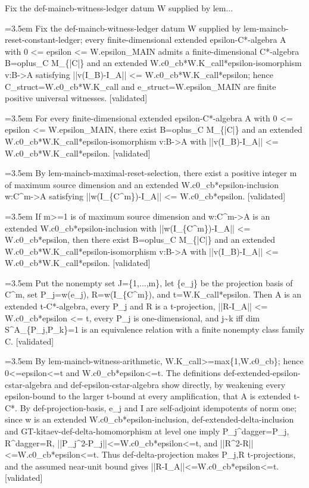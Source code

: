 \documentclass{article}
\newcommand{\step}[1]{\par\noindent\hangindent=3.5em\hangafter=1%
  \makebox[3.5em][l]{\textbf{#1.}}}
\newcommand{\steptag}[1]{\hfill{\small\textsf{[#1]}}}
\begin{document}
\begin{proofbox}{Fix the def-maincb-witness-ledger datum W supplied by lem...}
\step{1} Fix the def-maincb-witness-ledger datum W supplied by lem-maincb-reset-constant-ledger; every finite-dimensional extended epsilon-C*-algebra A with 0 <= epsilon <= W.epsilon\_MAIN admits a finite-dimensional C*-algebra B=oplus\_C M\_\{|C|\} and an extended W.c0\_cb*W.K\_call*epsilon-isomorphism v:B->A satisfying ||v(I\_B)-I\_A|| <= W.c0\_cb*W.K\_call*epsilon; hence C\_struct=W.c0\_cb*W.K\_call and e\_struct=W.epsilon\_MAIN are finite positive universal witnesses. \steptag{validated} \\[6pt]
\step{1.1} For every finite-dimensional extended epsilon-C*-algebra A with 0 <= epsilon <= W.epsilon\_MAIN, there exist B=oplus\_C M\_\{|C|\} and an extended W.c0\_cb*W.K\_call*epsilon-isomorphism v:B->A with ||v(I\_B)-I\_A|| <= W.c0\_cb*W.K\_call*epsilon. \steptag{validated} \\[6pt]
\step{1.1.1} By lem-maincb-maximal-reset-selection, there exist a positive integer m of maximum source dimension and an extended W.c0\_cb*epsilon-inclusion w:C\textasciicircum{}m->A satisfying ||w(I\_\{C\textasciicircum{}m\})-I\_A|| <= W.c0\_cb*epsilon. \steptag{validated} \\[4pt]
\step{1.1.2} If m>=1 is of maximum source dimension and w:C\textasciicircum{}m->A is an extended W.c0\_cb*epsilon-inclusion with ||w(I\_\{C\textasciicircum{}m\})-I\_A|| <= W.c0\_cb*epsilon, then there exist B=oplus\_C M\_\{|C|\} and an extended W.c0\_cb*W.K\_call*epsilon-isomorphism v:B->A with ||v(I\_B)-I\_A|| <= W.c0\_cb*W.K\_call*epsilon. \steptag{validated} \\[6pt]
\step{1.1.2.1} Put the nonempty set J=\{1,...,m\}, let \{e\_j\} be the projection basis of C\textasciicircum{}m, set P\_j=w(e\_j), R=w(I\_\{C\textasciicircum{}m\}), and t=W.K\_call*epsilon. Then A is an extended t-C*-algebra, every P\_j and R is a t-projection, ||R-I\_A|| <= W.c0\_cb*epsilon <= t, every P\_j is one-dimensional, and j\textasciitilde{}k iff dim S\textasciicircum{}A\_\{P\_j,P\_k\}=1 is an equivalence relation with a finite nonempty class family C. \steptag{validated} \\[6pt]
\step{1.1.2.1.1} By lem-maincb-witness-arithmetic, W.K\_call>=max\{1,W.c0\_cb\}; hence 0<=epsilon<=t and W.c0\_cb*epsilon<=t. The definitions def-extended-epsilon-cstar-algebra and def-epsilon-cstar-algebra show directly, by weakening every epsilon-bound to the larger t-bound at every amplification, that A is extended t-C*. By def-projection-basis, e\_j and I are self-adjoint idempotents of norm one; since w is an extended W.c0\_cb*epsilon-inclusion, def-extended-delta-inclusion and GT-kitaev-def-delta-homomorphism at level one imply P\_j\textasciicircum{}dagger=P\_j, R\textasciicircum{}dagger=R, ||P\_j\textasciicircum{}2-P\_j||<=W.c0\_cb*epsilon<=t, and ||R\textasciicircum{}2-R||<=W.c0\_cb*epsilon<=t. Thus def-delta-projection makes P\_j,R t-projections, and the assumed near-unit bound gives ||R-I\_A||<=W.c0\_cb*epsilon<=t. \steptag{validated} \\[4pt]

\end{proofbox}
\end{document}
